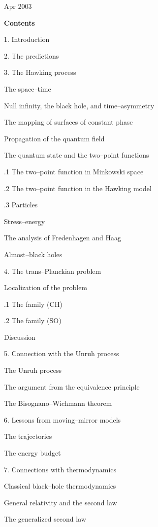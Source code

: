 \medskip
{} Apr 2003

\hfill\eject

\noindent\bf Contents \rm

1. Introduction 

2. The predictions

3. The Hawking process

 The space--time

 Null infinity, the black hole, and time--asymmetry

 The mapping of surfaces of constant phase

 Propagation of the quantum field

 The quantum state and the two--point functions

\qquad{}.1 The two--point function in Minkowski space

\qquad{}.2 The two--point function in the Hawking model

\qquad{}.3 Particles

 Stress--energy

 The analysis of Fredenhagen and Haag

 Almost--black holes

4. The trans--Planckian problem

 Localization of the problem

\qquad{}.1 The family (CH)

\qquad{}.2 The family (SO)

 Discussion

5. Connection with the Unruh process

 The Unruh process

 The argument from the equivalence principle

 The Bisognano--Wichmann theorem

6. Lessons from moving--mirror models

 The trajectories

 The energy budget

7. Connections with thermodynamics

 Classical black--hole thermodynamics

 General relativity and the second law

 The generalized second law

